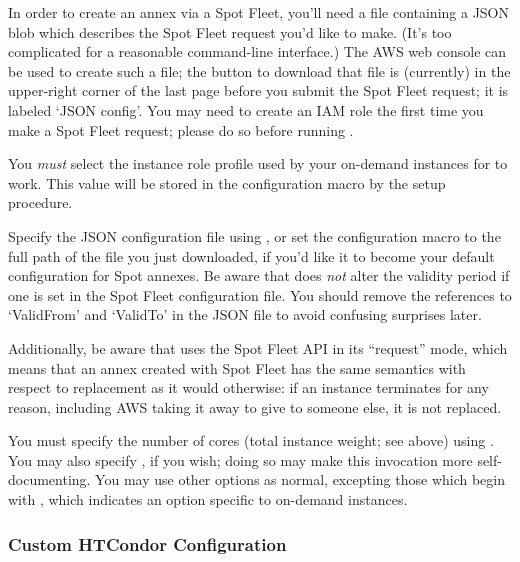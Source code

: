 In order to create an annex via a Spot Fleet, you'll need a file containing
a JSON blob which describes the Spot Fleet request you'd like to make.  (It's
too complicated for a reasonable command-line interface.)  The AWS web
console can be used to create such a file; the button to download that
file is (currently) in the upper-right corner of the last page before
you submit the Spot Fleet request; it is labeled `JSON config'.  You
may need to create an IAM role the first time you make a Spot Fleet
request; please do so before running .

You \emph{must} select the instance role profile used by your on-demand
instances for  to work.  This value will be stored in the
configuration macro 
by the setup procedure.


Specify the JSON configuration file using ,
or set the configuration macro  to
the full path of the file you just downloaded, if you'd like it to become
your default configuration for Spot annexes.  Be aware that 
does \emph{not} alter the validity period if one is set in the Spot
Fleet configuration file.  You should remove the references to `ValidFrom'
and `ValidTo' in the JSON file to avoid confusing surprises later.

Additionally, be aware that  uses the Spot Fleet API in
its ``request'' mode, which means that an annex created with Spot
Fleet has the same semantics with respect to replacement as it would
otherwise: if an instance terminates for any reason, including AWS
taking it away to give to someone else, it is not replaced.

You must specify the number of cores (total instance weight; see above) using
.  You may also specify , if you wish;
doing so may make this  invocation more self-documenting.
You may use other options as normal, excepting those which begin with
, which indicates an option specific to on-demand
instances.

\subsubsection{Custom HTCondor Configuration}

